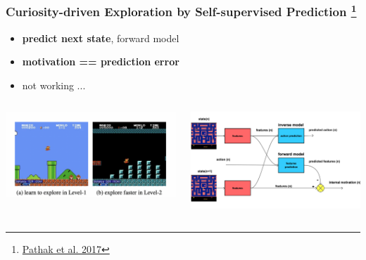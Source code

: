 \documentclass{beamer}
\begin{document}
\begin{frame}
  
  \frametitle{Curiosity-driven Exploration by Self-supervised Prediction
              \footnote{\href{https://arxiv.org/pdf/1705.05363.pdf}{Pathak et al. 2017}} }

    \begin{itemize}
      \item {\bf predict next state}, forward model
      \item {\bf motivation == prediction error}
      \item not working ...
    \end{itemize}

    \begin{columns}

      \begin{column}{0.5\textwidth}
        \centering
        \includegraphics[scale=0.25]{../papers_captions/icm.png}
      \end{column}

      \begin{column}{0.5\textwidth}
        \centering
        \includegraphics[scale=0.1]{../diagrams/internal_motivation/icm.png}
      \end{column}
    
    \end{columns}
    
\end{frame}
\end{document}
